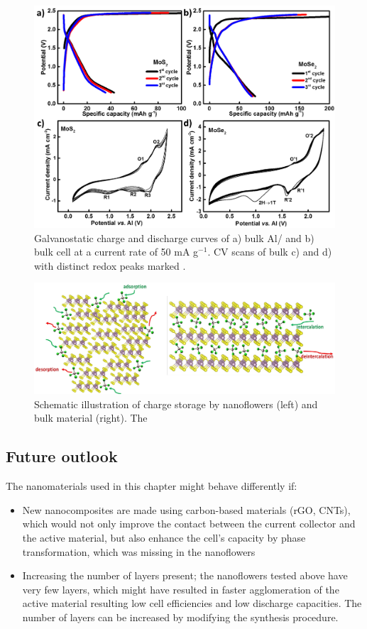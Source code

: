 \begin{figure}[h!]
  \centering
  \includegraphics[width=\textwidth]{Figures/chap6fig/mox2bulkcdccv}
    \caption{Galvanostatic charge and discharge curves of a) bulk Al/ and b) bulk  cell at a current rate of 50 mA g$^{-1}$. CV scans of bulk c)  and d)  with distinct redox peaks marked .}
  \label{Figures/chap6fig:mox2bulkcdccv}
\end{figure}

\begin{figure}[h!]
  \centering
  \includegraphics[width=\textwidth]{Figures/chap6fig/nanbulkmox2.pdf}
    \caption{Schematic illustration of charge storage by  nanoflowers (left) and bulk material (right). The }
  \label{Figures/chap6fig:nanbulkmox2}
\end{figure}

\subsection{Future outlook}
The nanomaterials used in this chapter might behave differently if:
\begin{itemize}
    \item New nanocomposites are made using carbon-based materials (rGO, CNTs), which would not only improve the contact between the current collector and the active material, but also enhance the cell's capacity by phase transformation, which was missing in the nanoflowers
    \item Increasing the number of layers present; the nanoflowers tested above have very few layers, which might have resulted in faster agglomeration of the active material resulting low cell efficiencies and low discharge capacities. The number of layers can be increased by modifying the synthesis procedure. 
\end{itemize}

